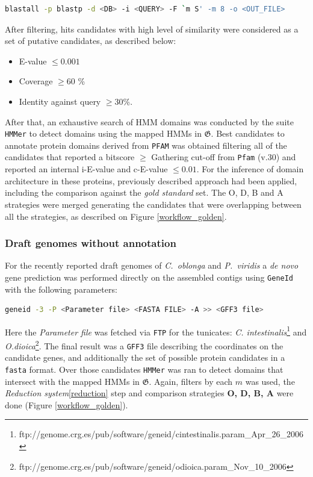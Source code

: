 \documentclass[11pt]{article}
\begin{document}
\begin{lstlisting}[language=bash, breaklines=true]
blastall -p blastp -d <DB> -i <QUERY> -F `m S' -m 8 -o <OUT_FILE>
\end{lstlisting}

After filtering, hits candidates with high level of similarity were 
considered as a set of putative candidates, as described below:

\begin{itemize}
\item E-value $\leq 0.001$
\item Coverage $\geq 60$ \%
\item Identity against query $\geq 30$\%.
\end{itemize}

After that, an exhaustive search of HMM domains was conducted by the suite 
\texttt{HMMer} to detect domains using the mapped HMMs in 
$\boldsymbol{\mathfrak{G}}$. Best candidates to annotate protein domains 
derived from \texttt{PFAM} was obtained filtering all of the candidates that 
reported a bitscore $\geq$ Gathering cut-off from \texttt{Pfam} (v.30) and 
reported an internal i-E-value and c-E-value $\leq 0.01$. For the inference of 
domain architecture in these proteins, previously described approach had been 
applied, including the comparison against the \textsl{gold standard} set. The O, 
D, B and A strategies were merged generating the candidates that were 
overlapping between all the strategies, as described on Figure 
\ref{workflow_golden}.

\subsubsection*{Draft genomes without annotation}

For the recently reported draft genomes of \textit{C.\ oblonga} and 
\textit{P.\ viridis} a \textit{de novo} gene prediction was performed 
directly on the assembled contigs using \texttt{GeneId} \cite{} 
with the following parameters:

\begin{lstlisting}[language=bash, breaklines=true]
geneid -3 -P <Parameter file> <FASTA FILE> -A >> <GFF3 file>
\end{lstlisting}

Here the \textit{Parameter file} was fetched via \texttt{FTP} for the 
tunicates: \textsl{C. intestinalis}\footnote{
ftp://genome.crg.es/pub/software/geneid/cintestinalis.param\_Apr\_26\_2006} and 
\textsl{O.dioica}\footnote{
ftp://genome.crg.es/pub/software/geneid/odioica.param\_Nov\_10\_2006}. The final 
result was a \texttt{GFF3} file describing the coordinates on the candidate 
genes, and additionally the set of possible protein candidates in a 
\texttt{fasta} format. Over those candidates \texttt{HMMer} was ran to detect 
domains that intersect with the mapped HMMs in $\boldsymbol{\mathfrak{G}}$. 
Again, filters by each $m$ was used, the \textsl{Reduction 
system}\ref{reduction} step and comparison strategies \textbf{O, D, B, A} were 
done (Figure \ref{workflow_golden}).
\end{document}
